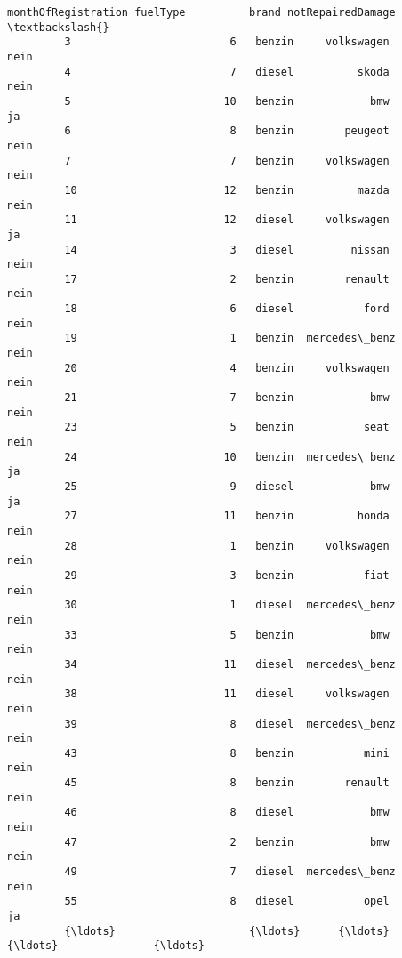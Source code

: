 \documentclass[11pt]{article}
\begin{document}
\begin{Verbatim}[commandchars=\\\{\}]
                 monthOfRegistration fuelType          brand notRepairedDamage  \textbackslash{}
         3                         6   benzin     volkswagen              nein   
         4                         7   diesel          skoda              nein   
         5                        10   benzin            bmw                ja   
         6                         8   benzin        peugeot              nein   
         7                         7   benzin     volkswagen              nein   
         10                       12   benzin          mazda              nein   
         11                       12   diesel     volkswagen                ja   
         14                        3   diesel         nissan              nein   
         17                        2   benzin        renault              nein   
         18                        6   diesel           ford              nein   
         19                        1   benzin  mercedes\_benz              nein   
         20                        4   benzin     volkswagen              nein   
         21                        7   benzin            bmw              nein   
         23                        5   benzin           seat              nein   
         24                       10   benzin  mercedes\_benz                ja   
         25                        9   diesel            bmw                ja   
         27                       11   benzin          honda              nein   
         28                        1   benzin     volkswagen              nein   
         29                        3   benzin           fiat              nein   
         30                        1   diesel  mercedes\_benz              nein   
         33                        5   benzin            bmw              nein   
         34                       11   diesel  mercedes\_benz              nein   
         38                       11   diesel     volkswagen              nein   
         39                        8   diesel  mercedes\_benz              nein   
         43                        8   benzin           mini              nein   
         45                        8   benzin        renault              nein   
         46                        8   diesel            bmw              nein   
         47                        2   benzin            bmw              nein   
         49                        7   diesel  mercedes\_benz              nein   
         55                        8   diesel           opel                ja   
         {\ldots}                     {\ldots}      {\ldots}            {\ldots}               {\ldots}   

\end{Verbatim}
\end{document}
